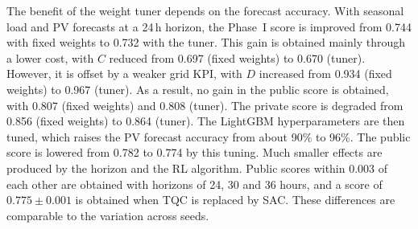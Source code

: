 \documentclass[conference]{IEEEtran}
\begin{document}
The benefit of the weight tuner depends on the forecast accuracy. With seasonal load and PV forecasts at a 24\,h horizon,
the Phase~I score is improved from 0.744 with fixed weights to 0.732 with the tuner. This gain is obtained mainly through a
lower cost, with $C$ reduced from 0.697 (fixed weights) to 0.670 (tuner). However, it is offset by a weaker grid KPI, with
$D$ increased from 0.934 (fixed weights) to 0.967 (tuner). As a result, no gain in the public score is obtained, with 0.807
(fixed weights) and 0.808 (tuner). The private score is degraded from 0.856 (fixed weights) to 0.864 (tuner). The LightGBM
hyperparameters are then tuned, which raises the PV forecast accuracy from about 90\% to 96\%. The public score is lowered
from 0.782 to 0.774 by this tuning. Much smaller effects are produced by the horizon and the RL algorithm. Public scores
within 0.003 of each other are obtained with horizons of 24, 30 and 36 hours, and a score of $0.775 \pm 0.001$ is obtained
when TQC is replaced by SAC. These differences are comparable to the variation across seeds.

\begin{table}[!t]
\centering
\caption{Ablations of the RL-tuned MPC, one change at a time (lower is better). The proposed method uses five seeds and the
other RL variants use three, while the fixed-weight controller is deterministic.}
\label{tab:ablation}
\setlength{\tabcolsep}{2.5pt}
\end{table}
\end{document}
